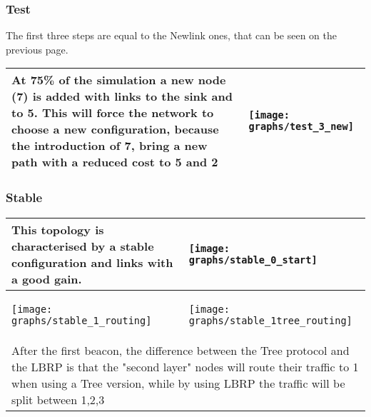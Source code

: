 \documentclass{article}
\begin{document}
\subsubsection{Test}
	The first three steps are equal to the Newlink ones, that can be seen on the previous page.
	\begin{table}[H]
		\centering
		\begin{tabular}{*{2}{m{}}}
			\hline
			\small At 75\% of the simulation a new node (7) is added with links to the sink and to 5. This will force the network to choose a new configuration, because the introduction of 7, bring a new path with a reduced cost to 5 and 2&\begin{center}\texttt{[image: graphs/test\_3\_new]}\end{center}\\
			\hline
		\end{tabular}
		\label{tab:testIndepthP1}
	\end{table}
\subsubsection{Stable}
	\begin{table}[H]
		\centering
		\begin{tabular}{*{2}{m{}}}
			\hline
			\small This topology is characterised by a stable configuration and links with a good gain. &\begin{center}\texttt{[image: graphs/stable\_0\_start]}\end{center}\\
			\hline
			\begin{center}\texttt{[image: graphs/stable\_1\_routing]}\end{center}&\begin{center}\texttt{[image: graphs/stable\_1tree\_routing]}\end{center}\\
			\multicolumn{2}{p{12cm}}{\small After the first beacon, the difference between the Tree protocol and the LBRP is that the "second layer" nodes will route their traffic to 1 when using a Tree version, while by using LBRP the traffic will be split between 1,2,3}\\
			\hline
		\end{tabular}
		\label{tab:stableIndepth}
	\end{table}
\clearpage






\end{document}
